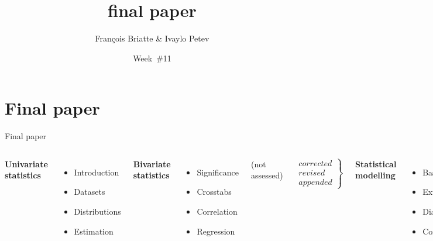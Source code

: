 \documentclass[t]{beamer}
\title{final paper}
\author{François Briatte \& Ivaylo Petev}
\date{Week~\#11}
\begin{document}
	
    \frame[plain]{
		\titlepage\\[7em]
		\tableofcontents[hideallsubsections]
		}


	\section{Final paper}

	\begin{frame}[t]{Final paper}
	
	\begin{columns}[T]
	\textbf{Univariate\\statistics}
	
	\vspace{.55em}
	\begin{itemize}
		\item Introduction
		\item Datasets
		\item Distributions
		\item Estimation
	\end{itemize}
	
	\textbf{Bivariate\\statistics}
	
	\begin{itemize}
		\item Significance
		\item Crosstabs
		\item Correlation
		\item Regression
	\end{itemize}
	(not assessed)
	
	$$
	\left.
    \begin{array}{rrr}
        corrected \\
        revised\\
        appended
    \end{array}
	\right \} 
	$$

	\textbf{Statistical\\modelling}
	
	\begin{itemize}
		\item Basics
		\item Extensions
		\item Diagnostics
		\item Conclusion
	\end{itemize}
	\\[.5em]
	\end{columns}
	
	\end{frame}
	
\end{document}
